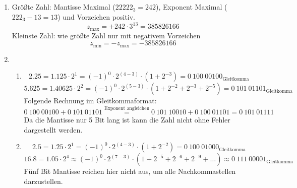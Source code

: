 \documentclass[DIN, pagenumber=false, fontsize=11pt, parskip=half]{scrartcl}
\begin{document}
    \subsection{}
    \begin{enumerate}[label=(\alph*)]
        \item
            Größte Zahl: Mantisse Maximal (${22222}_3 = 242$), Exponent Maximal (${222}_3 - 13 = 13$) und Vorzeichen positiv.
            \begin{equation*}
                z_\text{max} = + 242 \cdot 3^{13} = 385826166 
            \end{equation*}
            Kleinste Zahl: wie größte Zahl nur mit negativem Vorzeichen
            \begin{equation*}
                z_\text{min} = - z_\text{max} = -385826166
            \end{equation*}
        \item 
            \begin{enumerate}[label=\roman*.]
                \item 
                    \begin{equation*}
                        2.25 = 1.125 \cdot 2^1 = (-1)^0 \cdot 2^{(4-3)} \cdot (1 + 2^{-3}) = {0\ 100\ 00100}_\text{Gleitkomma} 
                    \end{equation*}
                    \begin{equation*}
                        5.625 = 1.40625 \cdot 2^2 = (-1)^0 \cdot 2^{(5-3)} \cdot (1 + 2^{-2} + 2^{-3} + 2^{-5}) = {0\ 101\ 01101}_\text{Gleitkomma} 
                    \end{equation*}
                    Folgende Rechnung im Gleitkommaformat:
                    \begin{equation*}
                        0\ 100\ 00100 + 0\ 101\ 01101 \stackrel{\text{Exponent angleichen}}{=} 0\ 101\ 10010 + 0\ 100\ 01101 = 0\ 101\ 01111
                    \end{equation*}
                    Da die Mantisse nur 5 Bit lang ist kann die Zahl nicht ohne Fehler dargestellt werden.
                \item 
                    \begin{equation*}
                        2.5 = 1.25 \cdot 2^1 = (-1)^0 \cdot 2^{(4-3)} \cdot (1 + 2^{-2}) = {0\ 100\ 01000}_\text{Gleitkomma}
                    \end{equation*}
                    \begin{equation*}
                        16.8 = 1.05 \cdot 2^4 \approx (-1)^0 \cdot 2^{(7-3)} \cdot (1 + 2^{-5} + 2^{-6} + 2^{-9} + \ldots) 
                        \approx {0\ 111\ 00001}_\text{Gleitkomma}
                    \end{equation*}
                    Fünf Bit Mantisse reichen hier nicht aus, um alle Nachkommastellen darzustellen.


\end{enumerate}
\end{enumerate}
\end{document}
